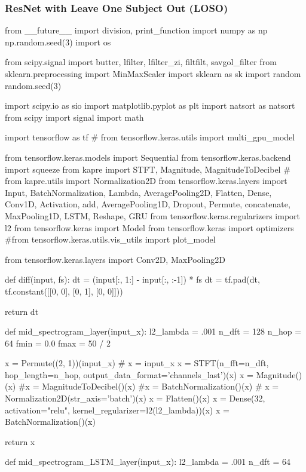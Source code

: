 \subsubsection*{ResNet with Leave One Subject Out (LOSO)}
\begin{python}
from __future__ import division, print_function
import numpy as np
np.random.seed(3)
import os

from scipy.signal import butter, lfilter, lfilter_zi, filtfilt, savgol_filter
from sklearn.preprocessing import MinMaxScaler
import sklearn as sk
import random
random.seed(3)

import scipy.io as sio
import matplotlib.pyplot as plt
import natsort as natsort
from scipy import signal
import math

import tensorflow as tf
# from tensorflow.keras.utils import multi_gpu_model

from tensorflow.keras.models import Sequential
from tensorflow.keras.backend import squeeze
from kapre import STFT, Magnitude, MagnitudeToDecibel
# from kapre.utils import Normalization2D
from tensorflow.keras.layers import Input, BatchNormalization, Lambda, AveragePooling2D, Flatten, Dense, Conv1D, Activation, add, AveragePooling1D, Dropout, Permute, concatenate, MaxPooling1D, LSTM, Reshape, GRU
from tensorflow.keras.regularizers import l2
from tensorflow.keras import Model
from tensorflow.keras import optimizers
#from tensorflow.keras.utils.vis_utils import plot_model

from tensorflow.keras.layers import Conv2D, MaxPooling2D

def diff(input, fs):
    dt = (input[:, 1:] - input[:, :-1]) * fs
    dt = tf.pad(dt, tf.constant([[0, 0], [0, 1], [0, 0]]))

    return dt

def mid_spectrogram_layer(input_x):
    l2_lambda = .001
    n_dft = 128
    n_hop = 64
    fmin = 0.0
    fmax = 50 / 2

    x = Permute((2, 1))(input_x)
    # x = input_x
    x = STFT(n_fft=n_dft, hop_length=n_hop, output_data_format='channels_last')(x)
    x = Magnitude()(x)
    #x = MagnitudeToDecibel()(x)
    #x = BatchNormalization()(x)
    # x = Normalization2D(str_axis='batch')(x)
    x = Flatten()(x)
    x = Dense(32, activation="relu", kernel_regularizer=l2(l2_lambda))(x)
    x = BatchNormalization()(x)

    return x


def mid_spectrogram_LSTM_layer(input_x):
    l2_lambda = .001
    n_dft = 64


\end{python}
